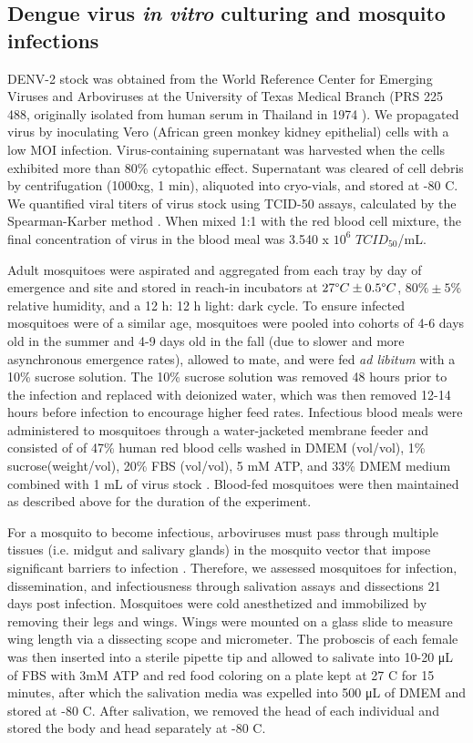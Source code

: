 \documentclass[12pt]{article}
\begin{document}
\subsection{Dengue virus \textit{in vitro} culturing and mosquito infections}
DENV-2 stock was obtained from the World Reference Center for Emerging Viruses and Arboviruses at the University of Texas Medical Branch (PRS 225 488, originally isolated from human serum in Thailand in 1974 \citep{vazeille-falcoz1999}). We propagated virus by inoculating Vero (African green monkey kidney epithelial) cells with a low MOI infection. Virus-containing supernatant was harvested when the cells exhibited more than 80\% cytopathic effect. Supernatant was cleared of cell debris by centrifugation (1000xg, 1 min), aliquoted into cryo-vials, and stored at -80 \degree C. We quantified viral titers of virus stock using TCID-50 assays, calculated by the Spearman-Karber method \citep{shao2016}. When mixed 1:1 with the red blood cell mixture, the final concentration of virus in the blood meal was 3.540 x $10^6$ $TCID_{50}$/mL.

Adult mosquitoes were aspirated and aggregated from each tray by day of emergence and site and stored in reach-in incubators at $27 \degree C \pm 0.5 \degree C$, $80\% \pm 5\%$ relative humidity, and a 12 h: 12 h light: dark cycle. To ensure infected mosquitoes were of a similar age, mosquitoes were pooled into cohorts of 4-6 days old in the summer and 4-9 days old in the fall (due to slower and more asynchronous emergence rates), allowed to mate, and were fed \textit{ad libitum} with a 10\% sucrose solution. The 10\% sucrose solution was removed 48 hours prior to the infection and replaced with deionized water, which was then removed 12-14 hours before infection to encourage higher feed rates. Infectious blood meals were administered to mosquitoes through a water-jacketed membrane feeder and consisted of of 47\% human red blood cells washed in DMEM (vol/vol), 1\% sucrose(weight/vol), 20\% FBS (vol/vol), 5 mM ATP, and 33\% DMEM medium combined with 1 mL of virus stock \citep{shan2016}. Blood-fed mosquitoes were then maintained as described above for the duration of the experiment.

For a mosquito to become infectious, arboviruses must pass through multiple tissues (i.e. midgut and salivary glands) in the mosquito vector that impose significant barriers to infection \citep{cheng2016}. Therefore, we assessed mosquitoes for infection, dissemination, and infectiousness through salivation assays and dissections \citep{hurlbut1966,anderson2010} 21 days post infection. Mosquitoes were cold anesthetized and immobilized by removing their legs and wings. Wings were mounted on a glass slide to measure wing length via a dissecting scope and micrometer. The proboscis of each female was then inserted into a sterile pipette tip and allowed to salivate into 10-20 \si{\micro\liter} of FBS with 3mM ATP and red food coloring on a plate kept at 27 \degree C for 15 minutes, after which the salivation media was expelled into 500 \si{\micro\liter} of DMEM and stored at -80 \degree C. After salivation, we removed the head of each individual and stored the body and head separately at -80 \degree C.
\end{document}
